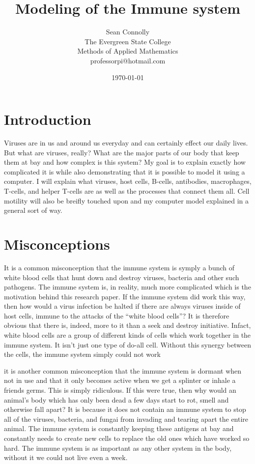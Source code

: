 \documentclass[12pt ]{report}
\begin{document}
\title{Modeling of the Immune system}
\author{Sean Connolly\\
The Evergreen State College\\
Methods of Applied Mathematics\\
professorpi@hotmail.com}
\date{\today}
\maketitle

\section*{Introduction}
Viruses are in us and around us everyday and can certainly effect our daily lives.  But what are viruses, really?  What are the major parts of our body that keep them at bay and how complex is this system?  My goal is to explain exactly how complicated it is while also demonstrating that it is possible to model it using a computer.  I will explain what viruses, host cells, B-cells, antibodies, macrophages, T-cells, and helper T-cells are as well as the processes that connect them all.  Cell motility will also be breifly touched upon and my computer model explained in a general sort of way.
\section*{Misconceptions}
It is a common misconception that the immune system is symply a bunch of white blood cells that hunt down and destroy viruses, bacteria and other such pathogens.  The immune system is, in reality, much more complicated which is the motivation behind this research paper.  If the immune system did work this way, then how would a virus infection be halted if there are always viruses inside of host cells, immune to the attacks of the "`white blood cells"'?  It is therefore obvious that there is, indeed, more to it than a seek and destroy initiative.  Infact, white blood cells are a group of different kinds of cells which work together in the immune system.  It isn't just one type of do-all cell.  Without this synergy between the cells, the immune system simply could not work

it is another common misconception that the immune system is dormant when not in use and that it only becomes active when we get a splinter or inhale a friends germs.  This is simply ridiculous.  If this were true, then why would an animal's body which has only been dead a few days start to rot, smell and otherwise fall apart?  It is because it does not contain an immune system to stop all of the viruses, bacteria, and fungai from invading and tearing apart the entire animal.  The immune system is constantly keeping these antigens at bay and constantly needs to create new cells to replace the old ones which have worked so hard.  The immune system is as important as any other system in the body, without it we could not live even a week.
\end{document}
